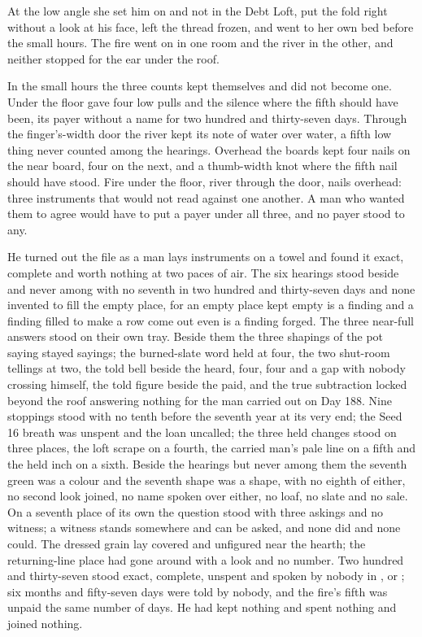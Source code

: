 At the low angle she set him on  and not in the Debt Loft, put the fold right without a look at his face, left the thread frozen, and went to her own bed before the small hours. The fire went on in one room and the river in the other, and neither stopped for the ear under the roof.

\scenebreak

In the small hours the three counts kept themselves and did not become one. Under the floor  gave four low pulls and the silence where the fifth should have been, its payer without a name for two hundred and thirty-seven days. Through the finger's-width door the river kept its note of water over water, a fifth low thing never counted among the hearings. Overhead the boards kept four nails on the near board, four on the next, and a thumb-width knot where the fifth nail should have stood. Fire under the floor, river through the door, nails overhead: three instruments that would not read against one another. A man who wanted them to agree would have to put a payer under all three, and no payer stood to any.

He turned out the file as a man lays instruments on a towel and found it exact, complete and worth nothing at two paces of air. The six hearings stood beside and never among with no seventh in two hundred and thirty-seven days and none invented to fill the empty place, for an empty place kept empty is a finding and a finding filled to make a row come out even is a finding forged. The three near-full answers stood on their own tray. Beside them the three shapings of the pot saying stayed sayings; the burned-slate word held at four, the two shut-room tellings at two, the told bell beside the heard, four, four and a gap with nobody crossing himself, the told figure beside the paid, and the true subtraction locked beyond the roof answering nothing for the man carried out on Day 188. Nine stoppings stood with no tenth before the seventh year at its very end; the Seed 16 breath was unspent and the loan uncalled; the three held changes stood on three places, the loft scrape on a fourth, the carried man's pale line on a fifth and the held inch on a sixth. Beside the hearings but never among them the seventh green was a colour and the seventh shape was a shape, with no eighth of either, no second look joined, no name spoken over either, no loaf, no slate and no sale. On a seventh place of its own the question stood with three askings and no witness; a witness stands somewhere and can be asked, and none did and none could. The dressed grain lay covered and unfigured near the hearth; the returning-line place had gone around with a look and no number. Two hundred and thirty-seven stood exact, complete, unspent and spoken by nobody in ,  or ; six months and fifty-seven days were told by nobody, and the fire's fifth was unpaid the same number of days. He had kept nothing and spent nothing and joined nothing.

